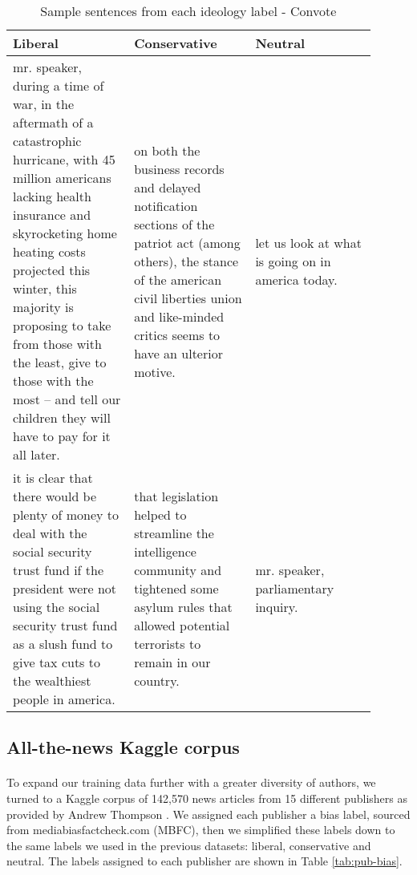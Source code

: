\documentclass[10pt,a4paper,onecolumn]{article}
\begin{document}
\begin{table}[h!]
	\begin{center}
		\caption{Sample sentences from each ideology label - Convote}
		\label{tab:convote-sentences}
		\begin{tabular}{p{0.3\linewidth}|p{0.3\linewidth}|p{0.3\linewidth}}
			\hline\hline
			\textbf{Liberal} & \textbf{Conservative} & \textbf{Neutral}\\
			\hline
			mr. speaker, during a time of war, in the aftermath of a catastrophic hurricane, with 45 million americans lacking health insurance and skyrocketing home heating costs projected this winter, this majority is proposing to take from those with the least, give to those with the most -- and tell our children they will have to pay for it all later. & on both the business records and delayed notification sections of the patriot act (among others), the stance of the american civil liberties union and like-minded critics seems to have an ulterior motive. & let us look at what is going on in america today. \\
			it is clear that there would be plenty of money to deal with the social security trust fund if the president were not using the social security trust fund as a slush fund to give tax cuts to the wealthiest people in america. & that legislation helped to streamline the intelligence community and tightened some asylum rules that allowed potential terrorists to remain in our country. & mr. speaker, parliamentary inquiry. \\
			\hline\hline
		\end{tabular}
	\end{center}
\end{table}

\subsection{All-the-news Kaggle corpus}
\paragraph{}
To expand our training data further with a greater diversity of authors, we turned to a Kaggle corpus of 142,570 news articles from 15 different publishers as provided by Andrew Thompson \cite{news}. We assigned each publisher a bias label, sourced from mediabiasfactcheck.com (MBFC), then we simplified these labels down to the same labels we used in the previous datasets: liberal, conservative and neutral. The labels assigned to each publisher are shown in Table \ref{tab:pub-bias}. 
\end{document}
